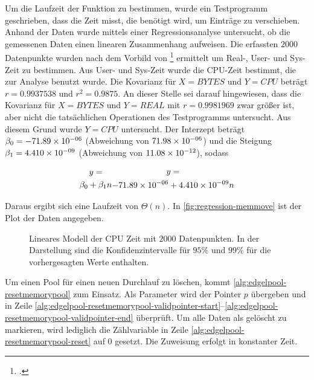 Um die Laufzeit der Funktion  zu bestimmen, wurde ein Testprogramm geschrieben, dass die Zeit misst,
 die benötigt wird, um Einträge zu verschieben. Anhand der Daten wurde mittels einer Regressionsanalyse untersucht, ob
 die gemessenen Daten einen linearen Zusammenhang aufweisen. Die erfassten $2000$ Datenpunkte wurden nach dem Vorbild
 von \footcite{time-1} ermittelt um Real-, User- und Sys-Zeit zu bestimmen. Aus User- und Sys-Zeit wurde
 die CPU-Zeit bestimmt, die zur Analyse benutzt wurde. Die Kovarianz für $X = \mathit{BYTES}$ und $Y = \mathit{CPU}$
 beträgt $r = 0.9937538$ und $r^2 = 0.9875$. An dieser Stelle sei darauf hingewiesen, dass die Kovarianz für
 $X = \mathit{BYTES}$ und $Y = \mathit{REAL}$ mit $r = 0.9981969$ zwar größer ist, aber nicht die tatsächlichen
 Operationen des Testprogramms untersucht. Aus diesem Grund wurde $Y = \mathit{CPU}$ untersucht. Der Interzept beträgt
 $\beta_0 = -71.89\times 10^{-06}$ (Abweichung von $71.98\times 10^{-06}$) und die Steigung $\beta_1 = 4.410\times 10^{-09}$ (Abweichung von
 $11.08\times 10^{-12}$), sodass

\begin{subequations}
\begin{multline}
	y =\\ \beta_0 + \beta_1n
\end{multline}
\begin{multline}
	y =\\ -71.89\e{-06} + 4.410\e{-09}n
\end{multline}
\end{subequations} %

Daraus ergibt sich eine Laufzeit von $\Theta(n)$. In \autoref{fig:regression-memmove} ist der Plot der Daten angegeben.

\begin{figure}[!ht]
	\centering
	
	\caption{Lineares Modell der CPU Zeit mit $2000$ Datenpunkten. In der Darstellung sind die Konfidenzintervalle für
	 $95\%$ und $99\%$ für die vorhergesagten Werte enthalten.}
	\label{fig:regression-memmove}
\end{figure}

Um einen Pool für einen neuen Durchlauf zu löschen, kommt \autoref{alg:edgelpool-resetmemorypool} zum Einsatz. Als
 Parameter wird der Pointer $p$ übergeben und in Zeile
 \ref{alg:edgelpool-resetmemorypool-validpointer-start}--\ref{alg:edgelpool-resetmemorypool-validpointer-end}
 überprüft. Um alle Daten als gelöscht zu markieren, wird lediglich die Zählvariable in Zeile
 \ref{alg:edgelpool-resetmemorypool-reset} auf $0$ gesetzt. Die Zuweisung erfolgt in konstanter Zeit.

